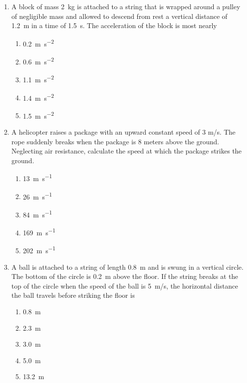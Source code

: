 \documentclass{../../oss-apphys}
\begin{document}
\begin{multicols}{2}
\begin{enumerate}[resume,leftmargin=18pt]
  \item A block of mass \SI{2}{kg} is attached to a string that is wrapped
    around a pulley of negligible mass and allowed to descend from rest a
    vertical distance of \SI{1.2}{\metre} in a time of \SI{1.5}{\second}. The
    acceleration of the block is most nearly
    \begin{center}
      \vspace{-.2in}
    \end{center}
    \begin{enumerate}[noitemsep,topsep=0pt,leftmargin=18pt,label=(\Alph*)]
    \item\SI{0.2}{\metre\per\second^2}
    \item\SI{0.6}{\metre\per\second^2}
    \item\SI{1.1}{\metre\per\second^2}
    \item\SI{1.4}{\metre\per\second^2}
    \item\SI{1.5}{\metre\per\second^2}
    \end{enumerate}
  \item A helicopter raises a package with an upward constant speed of 3 m/s.
    The rope suddenly breaks when the package is 8 meters above the
    ground. Neglecting air resistance, calculate the speed at which the
    package strikes the ground.
    \begin{enumerate}[noitemsep,topsep=0pt,leftmargin=18pt,label=(\Alph*)]
    \item\SI{13 }{\metre\per\second}
    \item\SI{26 }{\metre\per\second}
    \item\SI{84 }{\metre\per\second}
    \item\SI{169}{\metre\per\second}
    \item\SI{202}{\metre\per\second}
    \end{enumerate}
    
  \item A ball is attached to a string of length \SI{.8}{\metre} and is swung
    in a vertical circle. The bottom of the circle is \SI{.2}{\metre} above the
    floor. If the string breaks at the top of the circle when the speed of the
    ball is \SI{5}{m/s}, the horizontal distance the ball travels before
    striking the floor is
    \begin{center}
      \vspace{-.2in}
    \end{center}
    \begin{enumerate}[noitemsep,topsep=0pt,leftmargin=18pt,label=(\Alph*)]
    \item\SI{0.8 }{\metre}
    \item\SI{2.3 }{\metre}
    \item\SI{3.0 }{\metre}
    \item\SI{5.0 }{\metre}
    \item\SI{13.2}{\metre}
    \end{enumerate}
    

\end{enumerate}
\end{multicols}
\end{document}
